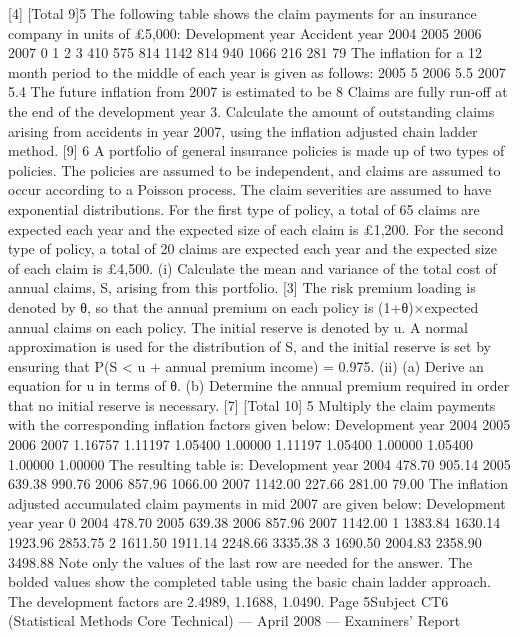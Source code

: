 [4]
[Total 9]5
The following table shows the claim payments for an insurance company in units of
£5,000:
Development year
Accident
year
2004
2005
2006
2007
0 1 2 3
410
575
814
1142 814
940
1066 216
281 79
The inflation for a 12 month period to the middle of each year is given as follows:
2005
5%
2006
5.5%
2007
5.4%
The future inflation from 2007 is estimated to be 8%
Claims are fully run-off at the end of the development year 3.
Calculate the amount of outstanding claims arising from accidents in year 2007, using
the inflation adjusted chain ladder method.
[9]
6
A portfolio of general insurance policies is made up of two types of policies. The
policies are assumed to be independent, and claims are assumed to occur according to
a Poisson process. The claim severities are assumed to have exponential distributions.
For the first type of policy, a total of 65 claims are expected each year and the
expected size of each claim is £1,200.
For the second type of policy, a total of 20 claims are expected each year and the
expected size of each claim is £4,500.
(i)
Calculate the mean and variance of the total cost of annual claims, S, arising
from this portfolio.
[3]
The risk premium loading is denoted by θ, so that the annual premium on each policy
is (1+θ)×expected annual claims on each policy. The initial reserve is denoted by u.
A normal approximation is used for the distribution of S, and the initial reserve is set
by ensuring that
P(S < u + annual premium income) = 0.975.
(ii)
(a) Derive an equation for u in terms of θ.
(b) Determine the annual premium required in order that no initial reserve
is necessary.
[7]
[Total 10]
5
Multiply the claim payments with the corresponding inflation factors given below:
Development year
2004
2005
2006
2007
1.16757 1.11197 1.05400 1.00000
1.11197 1.05400 1.00000
1.05400 1.00000
1.00000
The resulting table is:
Development year
2004 478.70 905.14
2005 639.38 990.76
2006 857.96 1066.00
2007 1142.00
227.66
281.00
79.00
The inflation adjusted accumulated claim payments in mid 2007 are given below:
Development year
year
0
2004 478.70
2005 639.38
2006 857.96
2007 1142.00
1
1383.84
1630.14
1923.96
2853.75
2
1611.50
1911.14
2248.66
3335.38
3
1690.50
2004.83
2358.90
3498.88
Note only the values of the last row are needed for the answer.
The bolded values show the completed table using the basic chain ladder approach.
The development factors are 2.4989, 1.1688, 1.0490.
Page 5Subject CT6 (Statistical Methods Core Technical) — April 2008 — Examiners’ Report
